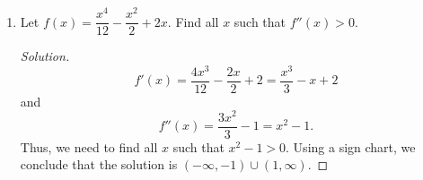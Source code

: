 \documentclass[12pt]{article}
\newenvironment{solution}{\begin{proof}[Solution]}{\end{proof}}
\begin{document}
\begin{enumerate}
\begin{enumerate}
\begin{solution}
				We test for vertical asymptotes at the points where $\sqrt{x^2-4}=0$, i.e., $x=\pm 2$.
				
				Note that the function is not defined for $x<2$ and $x>-2$, so we cannot find the left hand limit at 2 or the right hand limit at -2. Since 
				
				$\displaystyle{\lim_{x\to-2^-} \dfrac{x}{\sqrt{x^2-4}}}=-\infty$ and $\displaystyle{\lim_{x\to2^+} \dfrac{x}{\sqrt{x^2-4}}}=\infty$, the function has 2 vertical asymptotes $x=-2$ and $x=2$.
			\end{solution}
		\end{enumerate}
		\item Let $f(x)=\dfrac{x^4}{12}-\dfrac{x^2}{2}+2x$. Find all $x$ such that $f''(x)>0$.
		\begin{solution}
			$$f'(x)=\dfrac{4x^3}{12}-\dfrac{2x}{2}+2=\dfrac{x^3}{3}-x+2$$ and $$f''(x)=\dfrac{3x^2}{3}-1=x^2-1.$$
			Thus, we need to find all $x$ such that $x^2-1>0$. Using a sign chart, we conclude that the solution is $(-\infty,-1)\cup(1,\infty)$.
		\end{solution}
	\end{enumerate}
	
	
\end{document}
